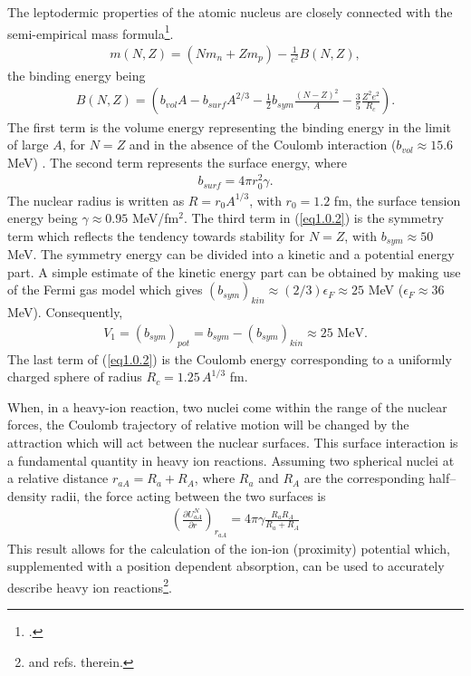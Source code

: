 The leptodermic properties of the atomic nucleus are closely connected with the semi-empirical mass formula\footnote{\cite{Weizsacker:35}.}.
\begin{align}
m(N,Z)=(Nm_n+Zm_p)-\frac{1}{c^2}B(N,Z),
\end{align}
the binding energy being
\begin{align}\label{eq1.0.2}
B(N,Z)=\left(b_{vol}A-b_{surf}A^{2/3}-\frac{1}{2} b_{sym}\frac{(N-Z)^2}{A}-\frac{3}{5}\frac{Z^2e^2}{R_c}\right).
\end{align}
The first term is the volume energy representing the binding energy in the limit of large $A$, for $N=Z$ and in the absence of the Coulomb interaction ($b_{vol}\approx15.6$ MeV) . The second term represents the surface energy, where
\begin{align}\label{eq1.0.3}
b_{surf}=4\pi r_0^2\gamma.
\end{align}
The nuclear radius is written as $R=r_0A^{1/3}$, with $r_0=1.2$ fm, the surface tension energy being $\gamma\approx 0.95$ MeV/fm$^2$. 
The third term in (\ref{eq1.0.2}) is the symmetry term which reflects the tendency towards stability for $N=Z$, with $b_{sym}\approx50$ MeV. The symmetry energy can be divided into a kinetic and a potential energy part. A simple estimate of the kinetic energy part can be obtained by making use of the Fermi gas model which gives $(b_{sym})_{kin}\approx(2/3)\epsilon_F\approx25$ MeV ($\epsilon_F\approx 36$ MeV). Consequently,
\begin{align}\label{eq1.0.4bis}
V_1=(b_{sym})_{pot}=b_{sym}-(b_{sym})_{kin}\approx 25\text{ MeV}.
\end{align}
The last term of (\ref{eq1.0.2}) is the Coulomb energy corresponding to a uniformly charged sphere of radius $R_c=1.25\,A^{1/3}$ fm.


When, in a heavy-ion reaction,  two nuclei come within the range of the nuclear forces, the Coulomb  trajectory of relative motion will be changed by the attraction which will act between the nuclear surfaces. This surface interaction is a fundamental quantity in  heavy ion reactions. Assuming two spherical nuclei at a relative distance $r_{aA}=R_a+R_A$, where $R_a$ and $R_A$ are the corresponding half--density radii, the force acting between the two surfaces is
\begin{align}\label{eq1.0.4}
\left(\frac{\partial U_{aA}^N}{\partial r}\right)_{r_{aA}}=4\pi \gamma\frac{R_aR_A}{R_a+R_A}
\end{align}
This result allows for the calculation of the ion-ion (proximity) potential which, supplemented with a position dependent absorption, can be used to accurately describe heavy ion reactions\footnote{\cite{Broglia:04a} and refs. therein.}.


